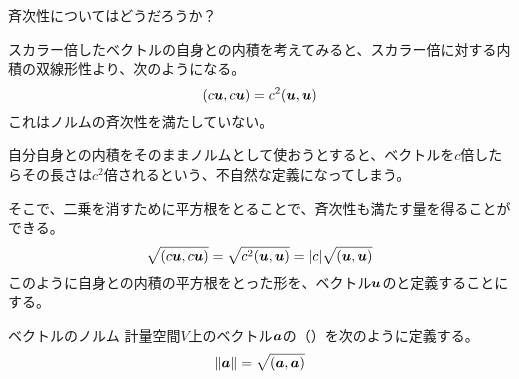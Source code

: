 \documentclass[../../../topic_linear-algebra]{subfiles}
\begin{document}
\br

斉次性についてはどうだろうか？

スカラー倍したベクトルの自身との内積を考えてみると、スカラー倍に対する内積の双線形性より、次のようになる。
\begin{equation*}
  (c\vb*{u}, c\vb*{u}) = c^2(\vb*{u}, \vb*{u})
\end{equation*}
これはノルムの斉次性を満たしていない。

\br

自分自身との内積をそのままノルムとして使おうとすると、ベクトルを$c$倍したらその長さは$c^2$倍されるという、不自然な定義になってしまう。

\br

そこで、二乗を消すために平方根をとることで、斉次性も満たす量を得ることができる。
\begin{equation*}
  \sqrt{(c\vb*{u}, c\vb*{u})} = \sqrt{c^2(\vb*{u}, \vb*{u})} = |c|\sqrt{(\vb*{u}, \vb*{u})}
\end{equation*}
このように自身との内積の平方根をとった形を、ベクトル$\vb*{u}$のと定義することにする。

\begin{definition*}{ベクトルのノルム}
  計量空間$V$上のベクトル$\vb*{a}$の（）を次のように定義する。
  \begin{align*}
    \|\vb*{a}\| = \sqrt{(\vb*{a}, \vb*{a})}
  \end{align*}
\end{definition*}
\end{document}
